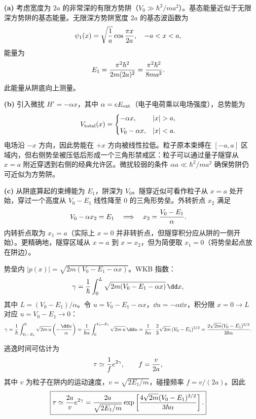 \begin{solution}
\textbf{(a)} 考虑宽度为 $2a$ 的非常深的有限方势阱（$V_0\gg\hbar^2/ma^2$）。基态能量近似于无限深方势阱的基态能量。无限深方势阱宽度 $2a$ 的基态波函数为
\[
\psi_1(x)=\sqrt{1\over a}\cos{\pi x\over 2a},\quad -a<x<a,
\]
能量为
\[
E_1={\pi^2\hbar^2\over 2m(2a)^2}={\pi^2\hbar^2\over 8ma^2}.
\]
此能量从阱底向上测量。

\textbf{(b)} 引入微扰 $H'=-\alpha x$，其中 $\alpha=eE_{\rm ext}$（电子电荷乘以电场强度），总势能为
\[
V_{\rm total}(x)=\begin{cases}
-\alpha x, & |x|>a,\\[4pt]
V_0-\alpha x, & |x|<a.
\end{cases}
\]
电场沿 $-x$ 方向，因此势能在 $+x$ 方向被线性拉低。粒子原本束缚在 $[-a,a]$ 区域内，但右侧势垒被压低后形成一个三角形禁戒区：粒子可以通过量子隧穿从 $x=a$ 附近穿透到右侧的经典允许区。微扰较弱的条件 $\alpha a\ll\hbar^2/ma^2$ 确保势阱仍可近似为方势阱。

\textbf{(c)} 从阱底算起的束缚能为 $E_1$，阱深为 $V_0$。隧穿近似可看作粒子从 $x=a$ 处开始，穿过一个高度从 $V_0-E_1$ 线性降至 $0$ 的三角形势垒。外转折点 $x_2$ 满足
\[
V_0-\alpha x_2 = E_1 \quad\Longrightarrow\quad
x_2 = {V_0-E_1\over\alpha}.
\]
内转折点取为 $x_1=a$（实际上 $x=0$ 并非转折点，但隧穿积分应从阱的一侧开始）。更精确地，隧穿区域从 $x=a$ 到 $x=x_2$，但为简便取 $x_1=0$（将势垒起点放在阱边）。

势垒内 $|p(x)|=\sqrt{2m(V_0-E_1-\alpha x)}$。WKB 指数：
\[
\gamma={1\over\hbar}\int_0^{L}\sqrt{2m(V_0-E_1-\alpha x)}\,\dd x,
\]
其中 $L=(V_0-E_1)/\alpha$。令 $u=V_0-E_1-\alpha x$，$\dd u=-\alpha\dd x$，积分限 $x=0\to L$ 对应 $u=V_0-E_1\to 0$：
\[
\gamma={1\over\hbar}\int_{V_0-E_1}^{0}\sqrt{2m\,u}\left(-{\dd u\over\alpha}\right)
={1\over\hbar\alpha}\int_0^{V_0-E_1}\sqrt{2m\,u}\,\dd u
={1\over\hbar\alpha}\cdot{2\over3}\sqrt{2m}\,(V_0-E_1)^{3/2}
={2\sqrt{2m}(V_0-E_1)^{3/2}\over3\hbar\alpha}.
\]

逃逸时间可估计为
\[
\tau\simeq {1\over f}e^{2\gamma},\qquad f={v\over 2a},
\]
其中 $v$ 为粒子在阱内的运动速度，$v=\sqrt{2E_1/m}$，碰撞频率 $f=v/(2a)$。因此
\[
\boxed{\tau\simeq {2a\over v}e^{2\gamma}
={2a\over\sqrt{2E_1/m}}\exp\left[{4\sqrt{2m}(V_0-E_1)^{3/2}\over3\hbar\alpha}\right].}
\]


\end{solution}
